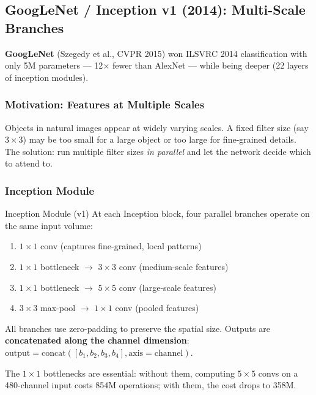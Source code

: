 \documentclass[11pt,a4paper]{article}
\newcommand{\term}[1]{\textcolor{DefGreen}{\textbf{#1}}}
\begin{document}
\subsection{GoogLeNet / Inception v1 (2014): Multi-Scale Branches}
\label{sec:inception}

\term{GoogLeNet} (Szegedy et al., CVPR 2015) won ILSVRC 2014 classification with only 5M parameters — 12$\times$ fewer than AlexNet — while being deeper (22 layers of inception modules).

\subsubsection{Motivation: Features at Multiple Scales}

Objects in natural images appear at widely varying scales. A fixed filter size (say $3\times3$) may be too small for a large object or too large for fine-grained details. The solution: run multiple filter sizes \emph{in parallel} and let the network decide which to attend to.

\subsubsection{Inception Module}

\begin{defbox}{Inception Module (v1)}
At each Inception block, four parallel branches operate on the same input volume:
\begin{enumerate}
  \item $1\times1$ conv (captures fine-grained, local patterns)
  \item $1\times1$ bottleneck $\to$ $3\times3$ conv (medium-scale features)
  \item $1\times1$ bottleneck $\to$ $5\times5$ conv (large-scale features)
  \item $3\times3$ max-pool $\to$ $1\times1$ conv (pooled features)
\end{enumerate}
All branches use zero-padding to preserve the spatial size. Outputs are \textbf{concatenated along the channel dimension}: $\mathrm{output} = \mathrm{concat}([b_1, b_2, b_3, b_4], \text{axis}=\mathrm{channel})$.
\end{defbox}

The $1\times1$ bottlenecks are essential: without them, computing $5\times5$ convs on a 480-channel input costs 854M operations; with them, the cost drops to 358M.
\end{document}

